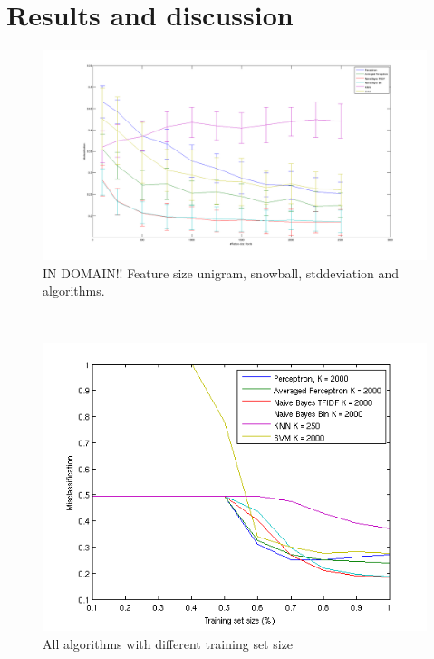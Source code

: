 \chapter{Results and discussion}

\begin{figure}[h!]
\centering
\includegraphics[scale = 0.2]{fig/featuresize_plot_snowball_unigram.png}
\caption{IN DOMAIN!! Feature size unigram, snowball, stddeviation and algorithms.}
\label{fig:trainingsize}
\end{figure} \\


\begin{figure}[h!]
\centering
\includegraphics[scale = 0.5]{fig/training-size.png}
\caption{All algorithms with different training set size}
\label{fig:trainingsize}
\end{figure} \\
